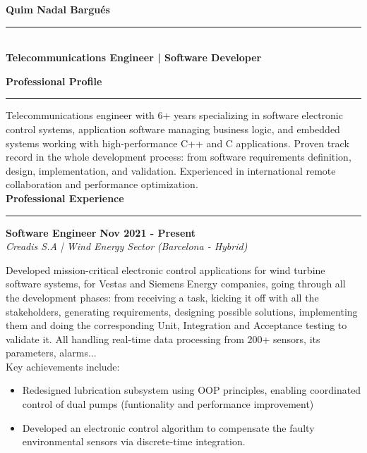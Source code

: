 \documentclass[11pt,a4paper]{article}
\newcommand{\cvsection}[1]{
    \vspace{0.5em}
    \noindent\textbf{\large #1}
    \vspace{0.5em}
    \hrule\vspace{0.5em}
}
\begin{document}
\hfill
\begin{minipage}[t]{0.68\textwidth} %
    \vspace*{-28\baselineskip} %
    \nointerlineskip
    \begin{flushleft}
        {\fontsize{22}{0}\selectfont\bfseries Quim Nadal Bargués} \\ %
        \vspace{-8pt} %
        \rule{\linewidth}{0.5pt} \\
        \vspace{4pt}
        {\large\bfseries Telecommunications Engineer | Software Developer}
    \end{flushleft}
    
    \cvsection{Professional Profile}
    Telecommunications engineer with 6+ years specializing in software electronic control systems, application software managing business logic, and embedded systems working with high-performance C++ and C applications. Proven track record in the whole development process: from software requirements definition, design, implementation, and validation.
    Experienced in international remote collaboration and performance optimization. \\
    
   
    \cvsection{Professional Experience}
    
    \noindent
    \textbf{Software Engineer} \hfill \textbf{Nov 2021 - Present} \\
    \textit{Creadis S.A | Wind Energy Sector} \hfill \textit{(Barcelona - Hybrid)} \vspace{4pt}
    
    Developed mission-critical electronic control applications for wind turbine software systems, for Vestas and Siemens Energy companies, going through all the development phases: from receiving a task, kicking it off with all the stakeholders, generating requirements, designing possible solutions, implementing them and doing the corresponding Unit, Integration and Acceptance testing to validate it. All handling real-time data processing from 200+ sensors, its parameters, alarms... \\
    Key achievements include:
    \begin{itemize}[leftmargin=*,topsep=2pt,itemsep=-1pt]
        \item Redesigned lubrication subsystem using OOP principles, enabling coordinated control of dual pumps (funtionality and performance improvement)
        \item Developed an electronic control algorithm to compensate the faulty environmental sensors via discrete-time integration.
    \end{itemize}
    

\end{minipage}
\end{document}
